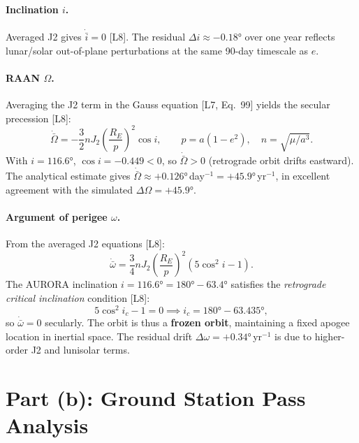 \documentclass[11pt,a4paper]{article}
\begin{document}
\paragraph{Inclination $i$.}
Averaged J2 gives $\dot{\bar{i}}=0$ [L8]. The residual $\Delta i\approx -0.18°$ over one year reflects lunar/solar out-of-plane perturbations at the same 90-day timescale as $e$.

\paragraph{RAAN $\Omega$.}
Averaging the J2 term in the Gauss equation [L7, Eq.~99] yields the secular precession [L8]:
\begin{equation}
    \dot{\bar{\Omega}} = -\frac{3}{2}n J_2\!\left(\frac{R_E}{p}\right)^{\!2}\cos i,
    \qquad p = a(1-e^2),\quad n=\sqrt{\mu/a^3}.
    \label{eq:raan}
\end{equation}
With $i=116.6°$, $\cos i = -0.449 < 0$, so $\dot{\bar{\Omega}}>0$ (retrograde orbit drifts eastward). The analytical estimate gives $\dot{\bar{\Omega}}\approx+0.126°$\,day$^{-1}=+45.9°$\,yr$^{-1}$, in excellent agreement with the simulated $\Delta\Omega=+45.9°$.

\paragraph{Argument of perigee $\omega$.}
From the averaged J2 equations [L8]:
\begin{equation}
    \dot{\bar{\omega}} = \frac{3}{4}n J_2\!\left(\frac{R_E}{p}\right)^{\!2}\!\left(5\cos^2 i - 1\right).
    \label{eq:omega}
\end{equation}
The AURORA inclination $i=116.6°=180°-63.4°$ satisfies the \emph{retrograde critical inclination} condition [L8]:
\begin{equation}
    5\cos^2 i_c - 1 = 0 \implies i_c = 180° - 63.435°,
\end{equation}
so $\dot{\bar{\omega}}=0$ secularly. The orbit is thus a \textbf{frozen orbit}, maintaining a fixed apogee location in inertial space. The residual drift $\Delta\omega=+0.34°$\,yr$^{-1}$ is due to higher-order J2 and lunisolar terms.

\section*{Part (b): Ground Station Pass Analysis}
\end{document}
